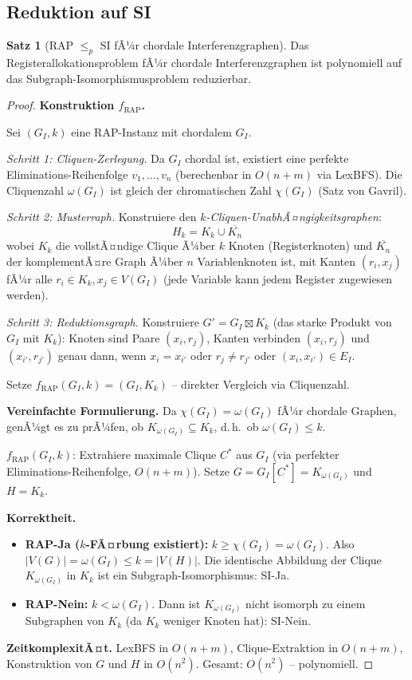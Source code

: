 ﻿\documentclass[a4paper,12pt]{article}
\theoremstyle{definition}
\newtheorem{satz}{Satz}
\begin{document}
\subsection{Reduktion auf SI}

\begin{satz}[RAP $\leq_p$ SI fÃ¼r chordale Interferenzgraphen]
\label{satz:rap-si}
Das Registerallokationsproblem fÃ¼r chordale Interferenzgraphen ist polynomiell auf das Subgraph-Isomorphismusproblem reduzierbar.
\end{satz}

\begin{proof}
\textbf{Konstruktion $f_{\text{RAP}}$.}

Sei $(G_I, k)$ eine RAP-Instanz mit chordalem $G_I$.

\textit{Schritt 1: Cliquen-Zerlegung.}
Da $G_I$ chordal ist, existiert eine perfekte Eliminations-Reihenfolge $v_1, \ldots, v_n$ (berechenbar in $O(n + m)$ via LexBFS). Die Cliquenzahl $\omega(G_I)$ ist gleich der chromatischen Zahl $\chi(G_I)$ (Satz von Gavril).

\textit{Schritt 2: Musterraph.}
Konstruiere den \emph{$k$-Cliquen-UnabhÃ¤ngigkeitsgraphen}:
\[
H_k = K_k \cup \overline{K_n}
\]
wobei $K_k$ die vollstÃ¤ndige Clique Ã¼ber $k$ Knoten (Registerknoten) und $\overline{K_n}$ der komplementÃ¤re Graph Ã¼ber $n$ Variablenknoten ist, mit Kanten $(r_i, x_j)$ fÃ¼r alle $r_i \in K_k, x_j \in V(G_I)$ (jede Variable kann jedem Register zugewiesen werden).

\textit{Schritt 3: Reduktionsgraph.}
Konstruiere $G' = G_I \boxtimes K_k$ (das starke Produkt von $G_I$ mit $K_k$): Knoten sind Paare $(x_i, r_j)$, Kanten verbinden $(x_i, r_j)$ und $(x_{i'}, r_{j'})$ genau dann, wenn $x_i = x_{i'}$ oder $r_j \neq r_{j'}$ oder $(x_i, x_{i'}) \in E_I$.

Setze $f_{\text{RAP}}(G_I, k) = (G_I, K_k)$ -- direkter Vergleich via Cliquenzahl.

\textbf{Vereinfachte Formulierung.}
Da $\chi(G_I) = \omega(G_I)$ fÃ¼r chordale Graphen, genÃ¼gt es zu prÃ¼fen, ob $K_{\omega(G_I)} \subseteq K_k$, d.\,h.\ ob $\omega(G_I) \leq k$.

$f_{\text{RAP}}(G_I, k)$: Extrahiere maximale Clique $C^*$ aus $G_I$ (via perfekter Eliminations-Reihenfolge, $O(n + m)$). Setze $G = G_I[C^*] = K_{\omega(G_I)}$ und $H = K_k$.

\textbf{Korrektheit.}
\begin{itemize}
    \item \textbf{RAP-Ja ($k$-FÃ¤rbung existiert):} $k \geq \chi(G_I) = \omega(G_I)$. Also $|V(G)| = \omega(G_I) \leq k = |V(H)|$. Die identische Abbildung der Clique $K_{\omega(G_I)}$ in $K_k$ ist ein Subgraph-Isomorphismus: SI-Ja.
    \item \textbf{RAP-Nein:} $k < \omega(G_I)$. Dann ist $K_{\omega(G_I)}$ nicht isomorph zu einem Subgraphen von $K_k$ (da $K_k$ weniger Knoten hat): SI-Nein.
\end{itemize}

\textbf{ZeitkomplexitÃ¤t.}
LexBFS in $O(n + m)$, Clique-Extraktion in $O(n + m)$, Konstruktion von $G$ und $H$ in $O(n^2)$. Gesamt: $O(n^2)$ -- polynomiell.
\end{proof}
\end{document}
